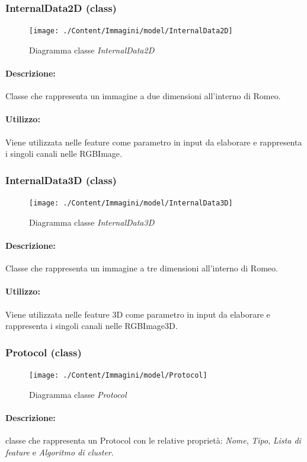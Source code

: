 	\subsubsection{InternalData2D (class)}
	\begin{figure}[!h]
		\centering
		\texttt{[image: ./Content/Immagini/model/InternalData2D]}
		\caption{Diagramma classe \textsl{InternalData2D}}
	\end{figure}
	\paragraph{Descrizione:} Classe che rappresenta un immagine a due dimensioni all'interno di Romeo\g{}.
	\paragraph{Utilizzo:} Viene utilizzata nelle feature\g{} come parametro in input da elaborare e rappresenta i singoli canali nelle RGBImage.
	\subsubsection{InternalData3D (class)}
	\begin{figure}[!h]
		\centering
		\texttt{[image: ./Content/Immagini/model/InternalData3D]}
		\caption{Diagramma classe \textsl{InternalData3D}}
	\end{figure}
	\paragraph{Descrizione:} Classe che rappresenta un immagine a tre dimensioni all'interno di Romeo\g{}.
	\paragraph{Utilizzo:} Viene utilizzata nelle feature\g{} 3D come parametro in input da elaborare e rappresenta i singoli canali nelle RGBImage3D.
	\subsubsection{Protocol (class)}
	\begin{figure}[!h]
		\centering
		\texttt{[image: ./Content/Immagini/model/Protocol]}
		\caption{Diagramma classe \textsl{Protocol}}
	\end{figure}
	\paragraph{Descrizione:} classe che rappresenta un Protocol\g{} con le relative proprietà: \emph{Nome}, \emph{Tipo}, \emph{Lista di feature\g{}} e \emph{Algoritmo di cluster\g{}}.

